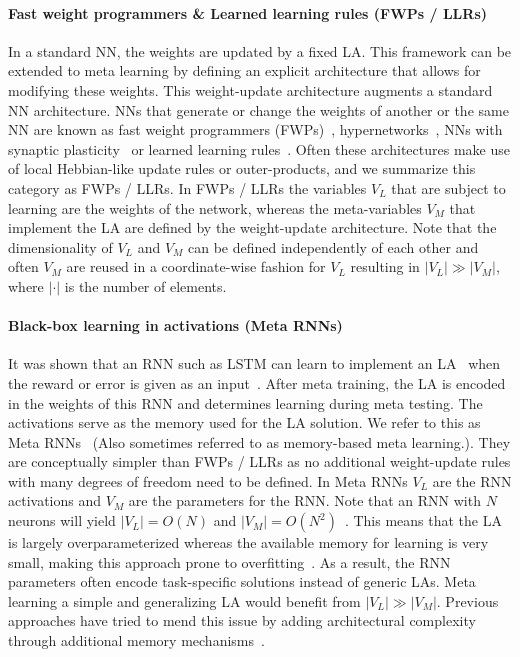 \documentclass{article}
\newcommand{\fws}{FWPs / LLRs}
\newcommand{\metarnns}{Meta RNNs}
\begin{document}
\paragraph{Fast weight programmers \& Learned learning rules (\fws)}
In a standard NN, the weights are updated by a fixed LA.
This framework can be extended to meta learning by defining an explicit architecture that allows for modifying these weights.
This weight-update architecture augments a standard NN architecture.
NNs that generate or change the weights of another or the same NN are known as fast weight programmers (FWPs)~\citep{Schmidhuber:91fastweights,Schmidhuber1992a,Schmidhuber1993a,Ba2016,Schlag}, hypernetworks~\citep{Ha2016}, NNs with synaptic plasticity~\citep{Miconi2018DifferentiableBackpropagation,Miconia,Najarro2020} or learned learning rules~\citep{Bengio1992OnRule,Gregor2020,Randazzo2020}.
Often these architectures make use of local Hebbian-like update rules or outer-products, and we summarize this category as {\fws}.
In {\fws} the variables $V_L$ that are subject to learning are the weights of the network, whereas the meta-variables $V_M$ that implement the LA are defined by the weight-update architecture.
Note that the dimensionality of $V_L$ and $V_M$ can be defined independently of each other and often $V_M$ are reused in a coordinate-wise fashion for $V_L$ resulting in $|V_L| \gg |V_M|$, where $|\cdot|$ is the number of elements.

\paragraph{Black-box learning in activations (\metarnns)}
It was shown that an RNN such as LSTM can learn to implement an LA~\citep{Hochreiter2001} when the reward or error is given as an input~\citep{Schmidhuber:93selfreficann}.
After meta training, the LA is encoded in the weights of this RNN and determines learning during meta testing.
The activations serve as the memory used for the LA solution.
We refer to this as Meta RNNs~\citep{Hochreiter2001,Duan2016,Wang2016}  (Also sometimes referred to as memory-based meta learning.).
They are conceptually simpler than {\fws} as no additional weight-update rules with many degrees of freedom need to be defined.
In {\metarnns} $V_L$ are the RNN activations and $V_M$ are the parameters for the RNN.
Note that an RNN with $N$ neurons will yield $|V_L| = O(N)$ and $|V_M| = O(N^2)$~\citep{Schmidhuber1993a}.
This means that the LA is largely overparameterized whereas the available memory for learning is very small, making this approach prone to overfitting~\citep{kirsch2020improving}.
As a result, the RNN parameters often encode task-specific solutions instead of generic LAs.
Meta learning a simple and generalizing LA would benefit from $|V_L| \gg |V_M|$.
Previous approaches have tried to mend this issue by adding architectural complexity through additional memory mechanisms~\citep{sun1991neural,mozer1993connectionist,Santoro,Mishra,schlag2021learning}.
\end{document}
